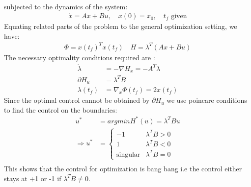 \begin{enumerate}
\begin{align*}
      \end{align*}
      subjected to the dynamics of the system:
	\begin{align*}
	\dot x = Ax + Bu, \quad x(0) = x_0, \quad t_f \mbox{ given}
	\end{align*}
    Equating related parts of the problem to the general optimization setting, we have:
      \begin{align*}
       \Phi = x(t_f)^T x(t_f) \quad H = \lambda^T (Ax+Bu) 
      \end{align*}
      The necessary optimality conditions required are :
      \begin{align*}
       \dot \lambda &= - \nabla H_x = - A^T \lambda \\
       \partial H_u &= \lambda^T B\\
       \lambda(t_f) &= \nabla_x \Phi(t_f) = 2 x(t_f)
      \end{align*}
      Since the optimal control cannot be obtained by $\partial H_u$ we use poincare conditions to find the control on the
boundaries:
     \begin{align*}
      u^* &= argmin H^* (u) = \lambda^T B u\\
      \Rightarrow u^* &= \begin{cases}
                         -1 & \lambda^T B > 0\\
                         1 & \lambda^T B < 0\\
                         \mbox{singular} & \lambda^T B = 0
                        \end{cases}\\
     \end{align*}
     This shows that the control for optimization is bang bang i.e the control either stays at +1 or -1 if $\lambda^T B \neq0$.
     

\end{enumerate}
